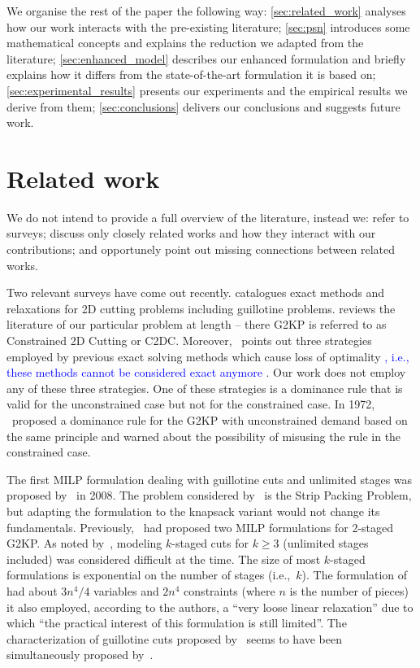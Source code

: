 \documentclass[smallextended]{svjour3}       %
\newif\iffinalversion
\newcommand{\newtext}[1]{\iffinalversion%
#1%
\else%
\textcolor{blue}{#1}%
\fi%
}
\begin{document}
We organise the rest of the paper the following way:
\autoref{sec:related_work} analyses how our work interacts with the pre-existing literature;
\autoref{sec:psn} introduces some mathematical concepts and explains the reduction we adapted from the literature;
\autoref{sec:enhanced_model} describes our enhanced formulation and briefly explains how it differs from the state-of-the-art formulation it is based on;
\autoref{sec:experimental_results} presents our experiments and the empirical results we derive from them;
\autoref{sec:conclusions} delivers our conclusions and suggests future work.

\section{Related work}
\label{sec:related_work}

We do not intend to provide a full overview of the literature, instead we:
refer to surveys; discuss only closely related works and how they interact with our contributions; and opportunely point out missing connections between related works.

Two relevant surveys have come out recently.
\cite{iori:2020} catalogues exact methods and relaxations for 2D cutting problems including guillotine problems.
\cite{russo:2020} reviews the literature of our particular problem at length -- there G2KP is referred to as Constrained 2D Cutting or C2DC.
Moreover, \cite{russo:2020}~points out three strategies employed by previous exact solving methods which cause loss of optimality\newtext{, i.e., these methods cannot be considered exact anymore}.
Our work does not employ any of these three strategies.
One of these strategies is a dominance rule that is valid for the unconstrained case but not for the constrained case.
In 1972, \cite{herz:1972}~proposed a dominance rule for the G2KP with unconstrained demand based on the same principle and warned about the possibility of misusing the rule in the constrained case.

The first MILP formulation dealing with guillotine cuts and unlimited stages was proposed by~\cite{messaoud:2008} in 2008.
The problem considered by~\cite{messaoud:2008} is the Strip Packing Problem, but adapting the formulation to the knapsack variant would not change its fundamentals.
Previously, \cite{lodi:2003}~had proposed two MILP formulations for 2-staged G2KP.
As noted by~\cite{belov_thesis:2003}, modeling \(k\)-staged cuts for \(k \geq 3\) (unlimited stages included) was considered difficult at the time.
The size of most \(k\)-staged formulations is exponential on the number of stages (i.e.,~\(k\)).
The formulation of~\cite{messaoud:2008} had about \(3n^4/4\) variables and \(2n^4\) constraints (where \(n\) is the number of pieces) it also employed, according to the authors, a ``very loose linear relaxation'' due to which ``the practical interest of this formulation is still limited''.
The characterization of guillotine cuts proposed by~\cite{messaoud:2008} seems to have been simultaneously proposed by~\cite{pisinger:2007}. %
\end{document}
